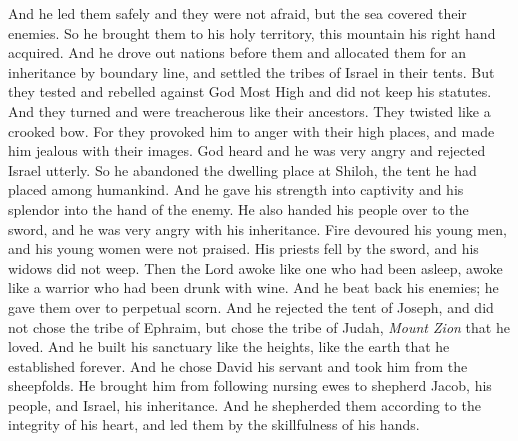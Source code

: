\begin{biblechapter}
\verse And he led them safely and they were not afraid, 
but the sea covered their enemies.
\verse So he brought them to his holy territory, 
this mountain his right hand acquired.
\verse And he drove out nations before them 
and allocated them for an inheritance by boundary line, 
and settled the tribes of Israel in their tents.
\verse But they tested and rebelled against God Most High 
and did not keep his statutes.
\verse And they turned and were treacherous like their ancestors. 
They twisted like a crooked bow.
\verse For they provoked him to anger with their high places, 
and made him jealous with their images.
\verse God heard and he was very angry 
and rejected Israel utterly.
\verse So he abandoned the dwelling place at Shiloh, 
the tent he had placed among humankind.
\verse And he gave his strength into captivity 
and his splendor into the hand of the enemy.
\verse He also handed his people over to the sword, 
and he was very angry with his inheritance.
\verse Fire devoured his young men, 
and his young women were not praised.
\verse His priests fell by the sword, 
and his widows did not weep.
\verse Then the Lord awoke like one who had been asleep, 
awoke like a warrior who had been drunk with wine.
\verse And he beat back his enemies; 
he gave them over to perpetual scorn.
\verse And he rejected the tent of Joseph, 
and did not chose the tribe of Ephraim,
\verse but chose the tribe of Judah, 
\textit{Mount Zion} that he loved.
\verse And he built his sanctuary like the heights, 
like the earth that he established forever.
\verse And he chose David his servant 
and took him from the sheepfolds.
\verse He brought him from following nursing ewes 
to shepherd Jacob, his people, 
and Israel, his inheritance.
\verse And he shepherded them according to the integrity of his heart, 
and led them by the skillfulness of his hands.
\end{biblechapter}

